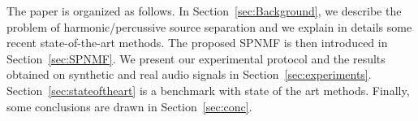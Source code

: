 
The paper is organized as follows. In Section~\ref{sec:Background}, we describe the problem of harmonic/percussive source separation and we explain in details some recent state-of-the-art methods. The proposed SPNMF is then introduced in Section~\ref{sec:SPNMF}. We present our experimental protocol and the results obtained on synthetic and real audio signals in Section~\ref{sec:experiments}. Section~\ref{sec:stateoftheart} is a benchmark with state of the art methods. Finally, some conclusions are drawn in Section~\ref{sec:conc}.

